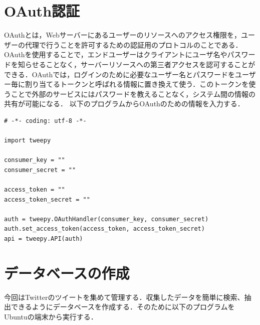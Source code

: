 \clearpage

\section{OAuth認証}
OAuthとは，Webサーバーにあるユーザーのリソースへのアクセス権限を，ユーザーの代理で行うことを許可するための認証用のプロトコルのことである．
OAuthを使用することで，エンドユーザーはクライアントにユーザ名やパスワードを知らせることなく，サーバーリソースへの第三者アクセスを認可することができる．OAuthでは，ログインのために必要なユーザー名とパスワードをユーザー毎に割り当てるトークンと呼ばれる情報に置き換えて使う．このトークンを使うことで外部のサービスにはパスワードを教えることなく，システム間の情報の共有が可能になる\cite{OAuth}．
以下のプログラムからOAuthのための情報を入力する．

\begin{lstlisting}
# -*- coding: utf-8 -*-

import tweepy

consumer_key = ""
consumer_secret = ""

access_token = ""
access_token_secret = ""

auth = tweepy.OAuthHandler(consumer_key, consumer_secret)
auth.set_access_token(access_token, access_token_secret)
api = tweepy.API(auth)
\end{lstlisting}

\section{データベースの作成}

今回はTwitterのツイートを集めて管理する．収集したデータを簡単に検索、抽出できるようにデータベースを作成する．そのために以下のプログラムをUbuntuの端末から実行する．





